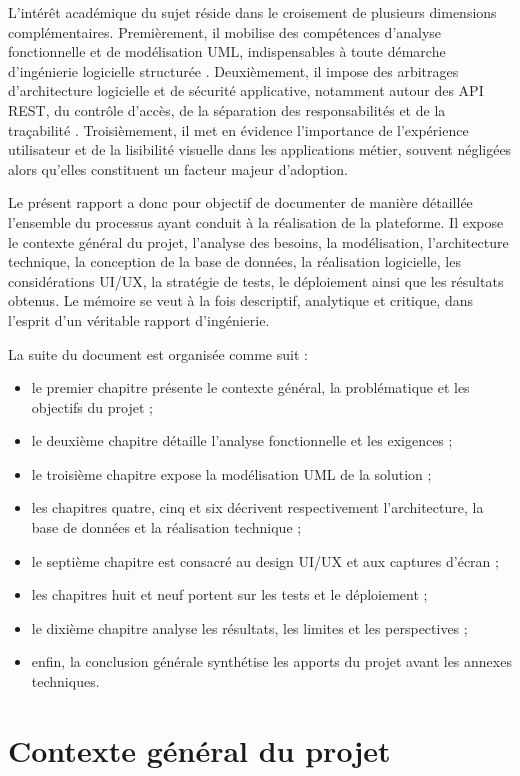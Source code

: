 ﻿\documentclass[12pt,a4paper,oneside]{report}
\begin{document}
L'intérêt académique du sujet réside dans le croisement de plusieurs dimensions complémentaires. Premièrement, il mobilise des compétences d'analyse fonctionnelle et de modélisation UML, indispensables à toute démarche d'ingénierie logicielle structurée \cite{booch2005}. Deuxièmement, il impose des arbitrages d'architecture logicielle et de sécurité applicative, notamment autour des API REST, du contrôle d'accès, de la séparation des responsabilités et de la traçabilité \cite{fielding2000,owasp2021}. Troisièmement, il met en évidence l'importance de l'expérience utilisateur et de la lisibilité visuelle dans les applications métier, souvent négligées alors qu'elles constituent un facteur majeur d'adoption.

Le présent rapport a donc pour objectif de documenter de manière détaillée l'ensemble du processus ayant conduit à la réalisation de la plateforme. Il expose le contexte général du projet, l'analyse des besoins, la modélisation, l'architecture technique, la conception de la base de données, la réalisation logicielle, les considérations UI/UX, la stratégie de tests, le déploiement ainsi que les résultats obtenus. Le mémoire se veut à la fois descriptif, analytique et critique, dans l'esprit d'un véritable rapport d'ingénierie.

La suite du document est organisée comme suit :
\begin{itemize}
  \item le premier chapitre présente le contexte général, la problématique et les objectifs du projet ;
  \item le deuxième chapitre détaille l'analyse fonctionnelle et les exigences ;
  \item le troisième chapitre expose la modélisation UML de la solution ;
  \item les chapitres quatre, cinq et six décrivent respectivement l'architecture, la base de données et la réalisation technique ;
  \item le septième chapitre est consacré au design UI/UX et aux captures d'écran ;
  \item les chapitres huit et neuf portent sur les tests et le déploiement ;
  \item le dixième chapitre analyse les résultats, les limites et les perspectives ;
  \item enfin, la conclusion générale synthétise les apports du projet avant les annexes techniques.
\end{itemize}

\chapter{Contexte général du projet}
\label{chap:contexte}
\end{document}
